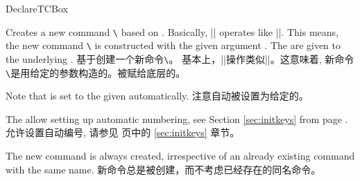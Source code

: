 \begin{docCommand}{DeclareTCBox}{}
\begin{stripedbox}
Creates a new command \texttt{\textbackslash} based on .
Basically, |\DeclareTCBox| operates like |\DeclareDocumentCommand|. This means,
the new command \texttt{\textbackslash} is constructed with the given argument .
The  are given to the underlying .
\tcblower
基于创建一个新命令\texttt{\textbackslash}。%
基本上，|\DeclareTCBox|操作类似|\DeclareDocumentCommand|。这意味着,%
新命令\texttt{\textbackslash}是用给定的参数构造的。被赋给底层的。
\end{stripedbox}


\begin{stripedbox}
Note that  is set to the given 
automatically.
\tcblower
注意自动被设置为给定的。
\end{stripedbox}

\begin{stripedbox}
The  allow setting up automatic numbering,
see Section \ref{sec:initkeys} from page \pageref{sec:initkeys}.
\tcblower
{}允许设置自动编号,
请参见 \pageref{sec:initkeys} 页中的 \ref{sec:initkeys} 章节。
\end{stripedbox}

\begin{stripedbox}
The new command is always created, irrespective of an already existing
command with the same name.
\tcblower
新命令总是被创建，而不考虑已经存在的同名命令。
\end{stripedbox}
  

\end{docCommand}

